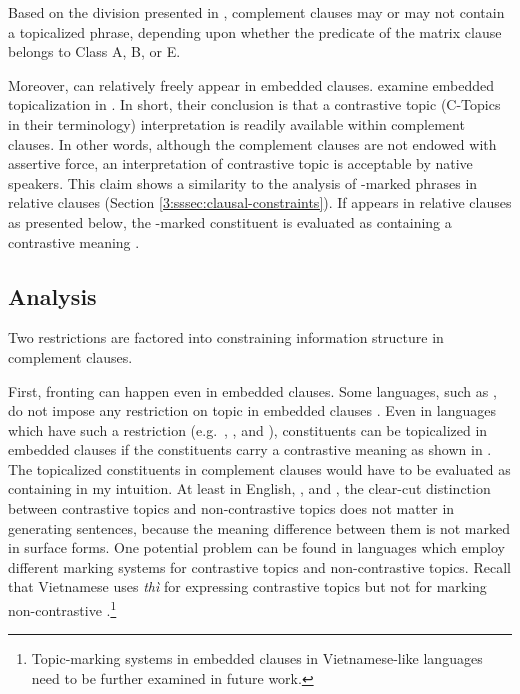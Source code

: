 \noindent Based on the division presented in
, complement clauses may or
may not contain a topicalized phrase, depending upon whether the
predicate of the matrix clause belongs to Class A, B, or E.


Moreover,  can relatively freely appear in embedded
clauses.  \citet{bianchi:frascarelli:10} examine embedded
topicalization in . In short, their
conclusion is that a contrastive topic (C-Topics in their terminology)
interpretation is readily available within complement clauses. In
other words, although the complement clauses are not endowed with
assertive force, an interpretation of contrastive topic is acceptable
by native speakers.  This claim shows a similarity to the analysis of
\onun-marked phrases in  relative clauses
(Section \ref{3:sssec:clausal-constraints}). If \nun
appears in relative clauses as presented below, the \onun-marked
constituent is evaluated as containing a contrastive meaning
\citep{lim:12}.





\subsection{Analysis}
\label{10:ssec:embedded:analysis}

Two restrictions are factored into constraining information
structure in complement clauses.

First,  fronting can happen even in embedded clauses. Some
languages, such as , do not impose any restriction on
topic  in embedded clauses \citep{roberts:11}. Even in
languages which have such a restriction (e.g.\ ,
, and ), constituents can be topicalized in
embedded clauses if the constituents carry a contrastive meaning as
shown in .  The topicalized constituents in
complement clauses would have to be evaluated as containing
 in my intuition.  At least in English,
, and , the clear-cut distinction between
contrastive topics and non-contrastive topics does not matter in
generating sentences,
because the meaning difference between them is
not marked in surface forms.  One potential problem can be found in
languages which employ different marking systems for contrastive
topics and non-contrastive topics. Recall that Vietnamese uses
\textit{th{\`i}} for expressing contrastive topics but not for marking
non-contrastive  \citep{nguyen:06}.\footnote{Topic-marking
  systems in embedded clauses in Vietnamese-like languages need to be
  further examined in future work.}


